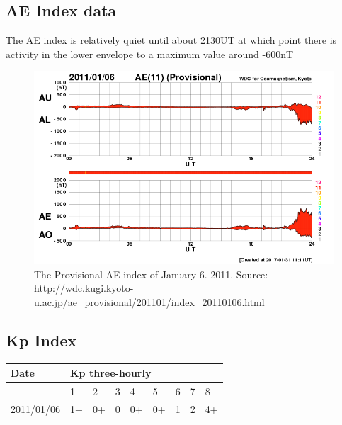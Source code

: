 \documentclass[norsk,a4paper,11pt]{article}
\begin{document}
\begin{multicols}{2}

\subsection{AE Index data} %
\label{sub:AE_index_data}

The AE index is relatively quiet until about 2130UT at which point there is activity in the lower envelope to a maximum value around -600nT
\begin{figure}[H]
	\includegraphics[scale=0.4]{Figures/pvae_2011_01_06.png}
	\centering
	\caption{The Provisional AE index of January 6. 2011. Source: \url{http://wdc.kugi.kyoto-u.ac.jp/ae_provisional/201101/index_20110106.html}}
	\label{fig:AE}
\end{figure}


\subsection{Kp Index} %
\label{sub:kp_index}

\begin{table}[H]
\begin{tabular}{|l|l|l|l|l|l|l|l|l|}
\hline
Date       & \multicolumn{8}{l|}{Kp three-hourly} \\ \hline
           & 1   & 2   & 3 & 4  & 5  & 6 & 7 & 8  \\ \hline
2011/01/06 & 1+  & 0+  & 0 & 0+ & 0+ & 1 & 2 & 4+ \\ \hline
\end{tabular}
\end{table}
 

\end{multicols}
\end{document}
